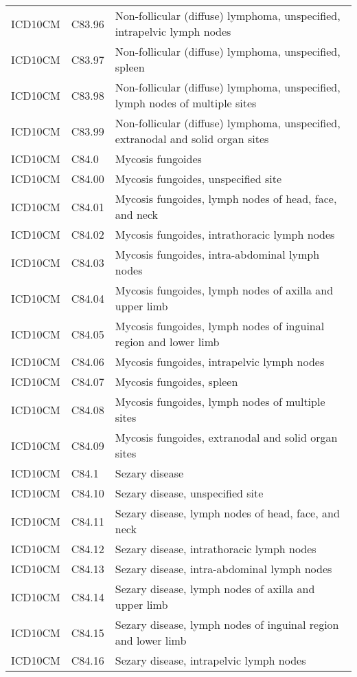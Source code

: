 \begin{longtable}{p{}p{}p{}}
  ICD10CM & C83.96 & Non-follicular (diffuse) lymphoma, unspecified, intrapelvic lymph nodes \\ 
  ICD10CM & C83.97 & Non-follicular (diffuse) lymphoma, unspecified, spleen \\ 
  ICD10CM & C83.98 & Non-follicular (diffuse) lymphoma, unspecified, lymph nodes of multiple sites \\ 
  ICD10CM & C83.99 & Non-follicular (diffuse) lymphoma, unspecified, extranodal and solid organ sites \\ 
  ICD10CM & C84.0 & Mycosis fungoides \\ 
  ICD10CM & C84.00 & Mycosis fungoides, unspecified site \\ 
  ICD10CM & C84.01 & Mycosis fungoides, lymph nodes of head, face, and neck \\ 
  ICD10CM & C84.02 & Mycosis fungoides, intrathoracic lymph nodes \\ 
  ICD10CM & C84.03 & Mycosis fungoides, intra-abdominal lymph nodes \\ 
  ICD10CM & C84.04 & Mycosis fungoides, lymph nodes of axilla and upper limb \\ 
  ICD10CM & C84.05 & Mycosis fungoides, lymph nodes of inguinal region and lower limb \\ 
  ICD10CM & C84.06 & Mycosis fungoides, intrapelvic lymph nodes \\ 
  ICD10CM & C84.07 & Mycosis fungoides, spleen \\ 
  ICD10CM & C84.08 & Mycosis fungoides, lymph nodes of multiple sites \\ 
  ICD10CM & C84.09 & Mycosis fungoides, extranodal and solid organ sites \\ 
  ICD10CM & C84.1 & Sezary disease \\ 
  ICD10CM & C84.10 & Sezary disease, unspecified site \\ 
  ICD10CM & C84.11 & Sezary disease, lymph nodes of head, face, and neck \\ 
  ICD10CM & C84.12 & Sezary disease, intrathoracic lymph nodes \\ 
  ICD10CM & C84.13 & Sezary disease, intra-abdominal lymph nodes \\ 
  ICD10CM & C84.14 & Sezary disease, lymph nodes of axilla and upper limb \\ 
  ICD10CM & C84.15 & Sezary disease, lymph nodes of inguinal region and lower limb \\ 
  ICD10CM & C84.16 & Sezary disease, intrapelvic lymph nodes \\ 

\end{longtable}
